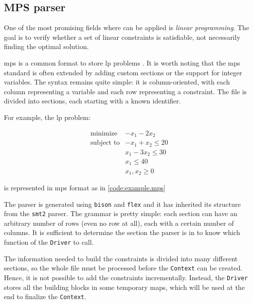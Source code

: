 \subsection*{MPS parser}

One of the most promising fields where \dlinear can be applied is \textit{linear programming}.
The goal is to verify whether a set of linear constraints is satisfiable, not necessarily finding the optimal solution.

\gls{mps} is a common format to store \gls{lp} problems \cite{man:mps}.
It is worth noting that the \gls{mps} standard is often extended by adding custom sections or the support for integer variables.
The syntax remains quite simple: it is column-oriented, with each column representing a variable and each row representing a constraint.
The file is divided into sections, each starting with a known identifier.

For example, the \gls{lp} problem:

\begin{equation*}
        \begin{aligned}
                 & \text{minimize}   & - x_1 - 2 x_2       \\
                 & \text{subject to} & - x_1 + x_2 \leq 20 \\
                 &                   & x_1 - 3 x_2 \leq 30 \\
                 &                   & x_1 \leq 40         \\
                 &                   & x_1, x_2 \geq 0
        \end{aligned}
\end{equation*}

is represented in \gls{mps} format as in \autoref{code:example.mps}



The parser is generated using \texttt{bison} and \texttt{flex} and it has inherited its structure from the \texttt{smt2} parser.
The grammar is pretty simple: each section can have an arbitrary number of rows (even no row at all), each with a certain number of columns.
It is sufficient to determine the section the parser is in to know which function of the \texttt{Driver} to call.

The information needed to build the constraints is divided into many different sections, so the whole file must be processed before the \texttt{Context} can be created.
Hence, it is not possible to add the constraints incrementally.
Instead, the \texttt{Driver} stores all the building blocks in some temporary maps, which will be used at the end to finalize the \texttt{Context}.

